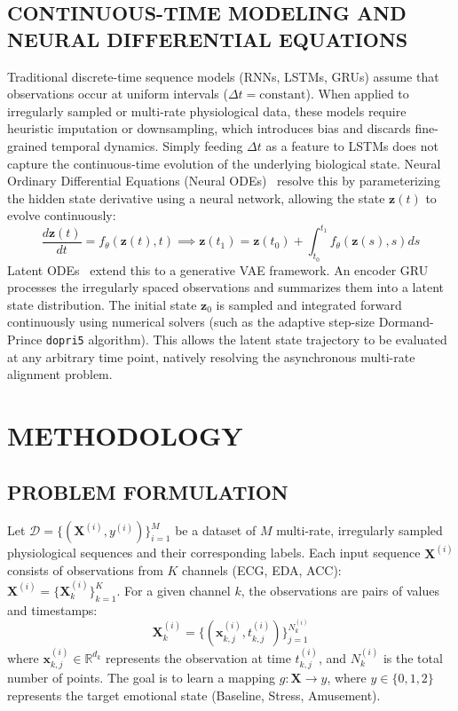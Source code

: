 \documentclass[12pt, a4paper]{report}
\numberwithin{equation}{chapter}
\begin{document}
\section{CONTINUOUS-TIME MODELING AND NEURAL DIFFERENTIAL EQUATIONS}
Traditional discrete-time sequence models (RNNs, LSTMs, GRUs) assume that observations occur at uniform intervals ($\Delta t = \text{constant}$). When applied to irregularly sampled or multi-rate physiological data, these models require heuristic imputation or downsampling, which introduces bias and discards fine-grained temporal dynamics. Simply feeding $\Delta t$ as a feature to LSTMs does not capture the continuous-time evolution of the underlying biological state. Neural Ordinary Differential Equations (Neural ODEs)~\cite{chen2018neural} resolve this by parameterizing the hidden state derivative using a neural network, allowing the state $\mathbf{z}(t)$ to evolve continuously:
\begin{equation}
\frac{d\mathbf{z}(t)}{dt} = f_\theta(\mathbf{z}(t), t) \implies \mathbf{z}(t_1) = \mathbf{z}(t_0) + \int_{t_0}^{t_1} f_\theta(\mathbf{z}(s), s) ds
\end{equation}
Latent ODEs~\cite{rubanova2019latent} extend this to a generative VAE framework. An encoder GRU processes the irregularly spaced observations and summarizes them into a latent state distribution. The initial state $\mathbf{z}_0$ is sampled and integrated forward continuously using numerical solvers (such as the adaptive step-size Dormand-Prince \texttt{dopri5} algorithm). This allows the latent state trajectory to be evaluated at any arbitrary time point, natively resolving the asynchronous multi-rate alignment problem.



\chapter{METHODOLOGY}

\section{PROBLEM FORMULATION}
Let $\mathcal{D} = \{(\mathbf{X}^{(i)}, y^{(i)})\}_{i=1}^M$ be a dataset of $M$ multi-rate, irregularly sampled physiological sequences and their corresponding labels. Each input sequence $\mathbf{X}^{(i)}$ consists of observations from $K$ channels (ECG, EDA, ACC): $\mathbf{X}^{(i)} = \{\mathbf{X}_k^{(i)}\}_{k=1}^K$. For a given channel $k$, the observations are pairs of values and timestamps:
\begin{equation}
\mathbf{X}_k^{(i)} = \{(\mathbf{x}_{k,j}^{(i)}, t_{k,j}^{(i)})\}_{j=1}^{N_k^{(i)}}
\end{equation}
where $\mathbf{x}_{k,j}^{(i)} \in \mathbb{R}^{d_k}$ represents the observation at time $t_{k,j}^{(i)}$, and $N_k^{(i)}$ is the total number of points. The goal is to learn a mapping $g: \mathbf{X} \rightarrow y$, where $y \in \{0, 1, 2\}$ represents the target emotional state (Baseline, Stress, Amusement).
\end{document}
